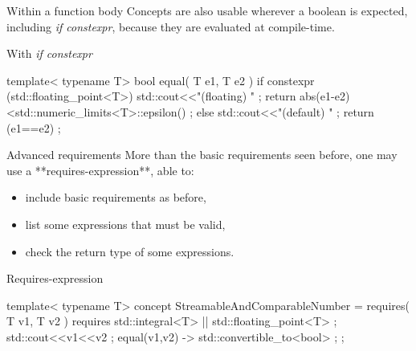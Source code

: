   \begin{frame}[fragile]
    \begin{block}{Within a function body}
    Concepts are also usable wherever a boolean is expected, including {\it if constexpr}, because they are evaluated at compile-time.
    \end{block}
    \begin{exampleblock}{With {\it if constexpr}}
      \begin{cppcode*}{}
      template< typename T>
      bool equal( T e1, T e2 )
      {
        if constexpr (std::floating_point<T>)
        {
          std::cout<<"(floating) " ;
          return abs(e1-e2)<std::numeric_limits<T>::epsilon() ;
        }
        else
        {
          std::cout<<"(default) " ;
          return (e1==e2) ;
        }
      }
      \end{cppcode*}
    \end{exampleblock}
  \end{frame}

  \begin{frame}[fragile]
    \begin{block}{Advanced requirements}
        More than the basic requirements seen before, one may use a **requires-expression**, able to:
        \begin{itemize}
            \item include basic requirements as before,
            \item list some expressions that must be valid,
            \item check the return type of some expressions.
        \end{itemize}
    \end{block}
    \begin{exampleblock}{Requires-expression}
      \begin{cppcode*}{}
      template< typename T>
      concept StreamableAndComparableNumber = requires( T v1, T v2 )
       {
        requires std::integral<T> || std::floating_point<T> ;
        std::cout<<v1<<v2 ;
        { equal(v1,v2) } -> std::convertible_to<bool> ;
       } ;
      \end{cppcode*}
    \end{exampleblock}
  \end{frame}
